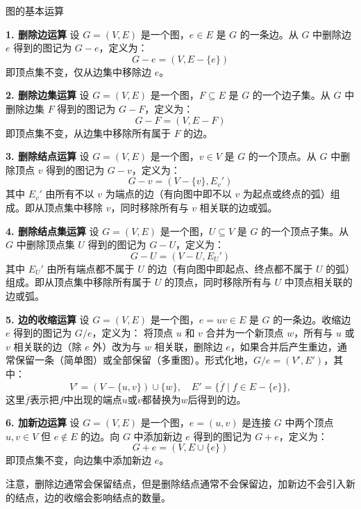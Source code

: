 \begin{definition}{图的基本运算}{}

\textbf{1. 删除边运算}
设 $G = (V, E)$ 是一个图，$e \in E$ 是 $G$ 的一条边。从 $G$ 中删除边 $e$ 得到的图记为 $G - e$，定义为：
\[
G - e = (V, E - \{e\})
\]
即顶点集不变，仅从边集中移除边 $e$。

\textbf{2. 删除边集运算}
设 $G = (V, E)$ 是一个图，$F \subseteq E$ 是 $G$ 的一个边子集。从 $G$ 中删除边集 $F$ 得到的图记为 $G - F$，定义为：
\[
G - F = (V, E- F)
\]
即顶点集不变，从边集中移除所有属于 $F$ 的边。

\textbf{3. 删除结点运算}
设 $G = (V, E)$ 是一个图，$v \in V$ 是 $G$ 的一个顶点。从 $G$ 中删除顶点 $v$ 得到的图记为 $G - v$，定义为：
\[
G - v = (V - \{v\}, E_v')
\]
其中 $E_v'$ 由所有不以 $v$ 为端点的边（有向图中即不以 $v$ 为起点或终点的弧）组成。即从顶点集中移除 $v$，同时移除所有与 $v$ 相关联的边或弧。

\textbf{4. 删除结点集运算}
设 $G = (V, E)$ 是一个图，$U \subseteq V$ 是 $G$ 的一个顶点子集。从 $G$ 中删除顶点集 $U$ 得到的图记为 $G - U$，定义为：
\[
G - U = (V - U, E_U')
\]
其中 $E_U'$ 由所有端点都不属于 $U$ 的边（有向图中即起点、终点都不属于 $U$ 的弧）组成。即从顶点集中移除所有属于 $U$ 的顶点，同时移除所有与 $U$ 中顶点相关联的边或弧。

\textbf{5. 边的收缩运算}
设 $G = (V, E)$ 是一个图，$e = uv \in E$ 是 $G$ 的一条边。收缩边 $e$ 得到的图记为 $G/e$，定义为：
将顶点 $u$ 和 $v$ 合并为一个新顶点 $w$，所有与 $u$ 或 $v$ 相关联的边（除 $e$ 外）改为与 $w$ 相关联，删除边 $e$，如果合并后产生重边，通常保留一条（简单图）或全部保留（多重图）。形式化地，$G/e = (V', E')$，其中：
\[
V' = (V - \{u, v\}) \cup \{w\}, \quad
E' = \{\overline{f}\mid f\in E-\{e\}\},
\]
这里$\overline{f}$表示把$f$中出现的端点$u$或$v$都替换为$w$后得到的边。

\textbf{6. 加新边运算}
设 $G = (V, E)$ 是一个图，$e = (u,v)$ 是连接 $G$ 中两个顶点 $u, v \in V$ 但 $e \notin E$ 的边。向 $G$ 中添加新边 $e$ 得到的图记为 $G + e$，定义为：
\[
G + e = (V, E \cup \{e\})
\]
即顶点集不变，向边集中添加新边 $e$。
\end{definition}
注意，删除边通常会保留结点，但是删除结点通常不会保留边，加新边不会引入新的结点，边的收缩会影响结点的数量。
